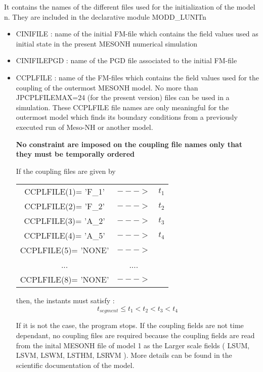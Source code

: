 It contains the names  of the different files used for the initialization of
 the model n. They are
included in the declarative module MODD\_LUNITn
\begin{itemize}
\item
{}
CINIFILE : name of the initial FM-file which contains the field values
  used as initial state in the present MESONH numerical simulation
\item
{}
CINIFILEPGD : name of the PGD file  associated to the initial FM-file
\item
{}
CCPLFILE : name of the FM-files which contains the field values used for the
coupling of the outermost MESONH model. No more than JPCPLFILEMAX=24 (for the
present version) files can be
used in a simulation. These CCPLFILE file names are only meaningful for the
outermost model which finds its boundary conditions from a previously executed 
run of Meso-NH or another model.

 {\bf No constraint are imposed on the coupling file names only that they must
be temporally ordered }

If the coupling files are given  by

\begin{tabular}{ccc}
CCPLFILE(1)= 'F\_1' & $--->$ & $t_1$ \\
CCPLFILE(2)= 'F\_2'  & $--->$ & $t_2$ \\
CCPLFILE(3)= 'A\_2'  & $--->$ & $t_3$ \\
CCPLFILE(4)= 'A\_5'  & $--->$ & $t_4$ \\
CCPLFILE(5)= 'NONE' & $--->$ &  \\
...                 & .... &  \\
CCPLFILE(8)= 'NONE' & $--->$ &  
\end{tabular} 

then, the instants must satisfy :
$$ t_{segment} \leq t_1 < t_2  < t_3  < t_4  $$

If it is not the case, the program stops. If the coupling fields are 
not time dependant, no coupling files are required because the coupling fields 
are read from the inital MESONH file of model 1 as the Larger
scale fields ( LSUM, LSVM, LSWM, LSTHM, LSRVM ). More details can be found in
the scientific documentation of the model.
\end{itemize}

